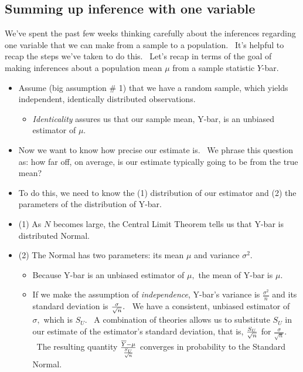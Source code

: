 \documentclass[11pt]{article}
\begin{document}
\subsection{Summing up inference with one variable}

We've spent the past few weeks thinking carefully about the inferences
regarding one variable that we can make from a sample to a population. \
It's helpful to recap the steps we've taken to do this. \ Let's recap in
terms of the goal of making inferences about a population mean $\mu $ from a
sample statistic $Y$-bar.

\begin{itemize}
\item Assume (big assumption \# 1) that we have a random sample, which
yields independent, identically distributed observations.

\begin{itemize}
\item \textit{Identicality} assures us that our sample mean, Y-bar, is an
unbiased estimator of $\mu .$
\end{itemize}

\item Now we want to know how precise our estimate is. \ We phrase this
question as: how far off, on average, is our estimate typically going to be
from the true mean?

\item To do this, we need to know the (1) distribution of our estimator and
(2) the parameters of the distribution of Y-bar.

\item (1) As $N$ becomes large, the Central Limit Theorem tells us that
Y-bar is distributed Normal.

\item (2) The Normal has two parameters: its mean $\mu $ and variance $%
\sigma ^{2}.$

\begin{itemize}
\item Because Y-bar is an unbiased estimator of $\mu ,$ the mean of Y-bar is 
$\mu .$

\item If we make the assumption of \textit{independence}, Y-bar's variance
is $\frac{\sigma ^{2}}{n}$ and its standard deviation is $\frac{\sigma }{%
\sqrt{n}}.$ \ We have a consistent, unbiased estimator of $\sigma ,$ which
is $S_{U}.$ \ A combination of theories allows us to substitute $S_{U}$ in
our estimate of the estimator's standard deviation, that is, $\frac{S_{U}}{%
\sqrt{n}}$ for $\frac{\sigma }{\sqrt{n}}.$ \ The resulting quantity $\frac{%
\overline{Y}-\mu }{\frac{S_{U}}{\sqrt{n}}}$ converges in probability to the
Standard Normal.
\end{itemize}


\end{itemize}
\end{document}
